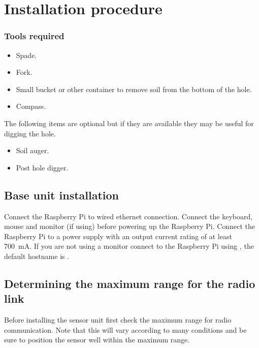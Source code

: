 \chapter{Installation procedure}

\subsection{Tools required}

\begin{itemize}
\item Spade.
\item Fork.
\item Small bucket or other container to remove soil from the bottom
  of the hole.
\item Compass.
\end{itemize}

The following items are optional but if they are available they may be
useful for digging the hole.
\begin{itemize}
\item Soil auger.
\item Post hole digger.
\end{itemize}

\section{Base unit installation}

Connect the Raspberry Pi to wired ethernet connection. Connect the
keyboard, mouse and monitor (if using) before powering up the
Raspberry Pi. Connect the Raspberry Pi to a  power supply with
an output current rating of at least \SI{700}{\milli A}. If you are
not using a monitor connect to the Raspberry Pi using \ssh, the
default hostname is .


\section{Determining the maximum range for the radio link}
\label{sec:find-maximum-range}
Before installing the sensor unit first check the maximum range for
radio communication. Note that this will vary according to many
conditions and be sure to position the sensor well within the maximum
range.

